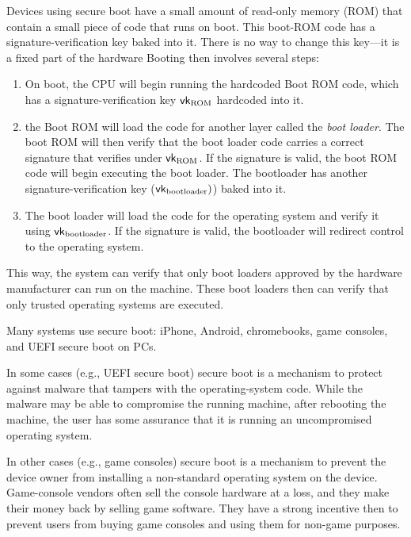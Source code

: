 Devices using secure boot have a small amount of read-only memory (ROM) that contain
a small piece of code that runs on boot.
This boot-ROM code has a signature-verification key baked into it. There is no
way to change this key---it is a fixed part of the hardware
Booting then involves several steps:
\begin{enumerate}
	\item On boot, the CPU will begin running the hardcoded Boot ROM code, 
        which has a signature-verification key $\mathsf{vk}_\text{ROM}$ hardcoded into it.
      \item the Boot ROM will load the code for another layer called the \emph{boot loader}. The boot ROM will then verify that the boot loader code carries a correct signature that verifies under $\mathsf{vk}_\text{ROM}$. If the signature is valid, the boot ROM code will begin executing the boot loader. The bootloader has another signature-verification key ($\mathsf{vk}_\text{bootloader})$) baked into it.
	\item The boot loader will load the code for the operating system and verify it using $\mathsf{vk}_\text{bootloader}$. If the signature is valid, the bootloader will redirect control to the operating system.
\end{enumerate}

This way, the system can verify that only boot loaders 
approved by the hardware manufacturer can run on the machine.
These boot loaders then can verify that only trusted operating systems are executed.

Many systems use secure boot: iPhone, Android, chromebooks, game consoles, 
and UEFI secure boot on PCs.

In some cases (e.g., UEFI secure boot) secure boot is a mechanism to protect
against malware that tampers with the operating-system code.
While the malware may be able to compromise the running machine, after
rebooting the machine, the user has some assurance that it is running
an uncompromised operating system.

In other cases (e.g., game consoles) secure boot is a mechanism to
prevent the device owner from installing a non-standard operating
system on the device. Game-console vendors often sell the console
hardware at a loss, and they make their money back by selling game software.
They have a strong incentive then to prevent users from buying
game consoles and using them for non-game purposes.

